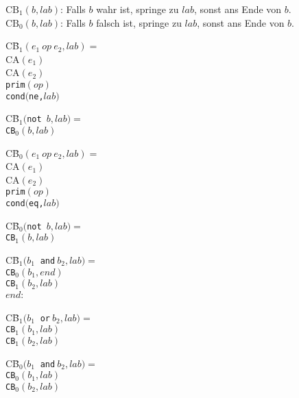 \documentclass[german,10pt, a4paper, twocolumn]{scrartcl}
\theoremstyle{definition}
\theoremstyle{remark}
\begin{document}
$\mbox{CB}_1(b,lab)$: Falls $b$ wahr ist, springe zu $lab$, sonst ans Ende von $b$.\\
$\mbox{CB}_0(b,lab)$: Falls $b$ falsch ist, springe zu $lab$, sonst ans Ende von $b$.

\begin{tabbing}
 CB\=$_1(e_1\ op\ e_2,lab) =$ \\
 \>	CA$(e_1)$\\
 \>	CA$(e_2)$\\
 \>	\tt{prim}$(op)$\\
 \>	\tt{cond}$($\tt{ne},$lab)$
\end{tabbing}

\begin{tabbing}
 CB\=$_1($\tt{not }$b,lab) =$ \\
 \>	CB$_0(b,lab)$\\
\end{tabbing}

\begin{tabbing}
 CB\=$_0(e_1\ op\ e_2,lab) =$ \\
 \>	CA$(e_1)$\\
 \>	CA$(e_2)$\\
 \>	\tt{prim}$(op)$\\
 \>	\tt{cond}$($\tt{eq},$lab)$
\end{tabbing}

\begin{tabbing}
 CB\=$_0($\tt{not }$b,lab) =$ \\
 \>	CB$_1(b,lab)$\\
\end{tabbing}

\begin{tabbing}
 CB\=$_1(b_1\ $ \tt{and}$ \ b_2,lab) =$ \\
 \>	CB$_0(b_1,end)$\\
 \>	CB$_1(b_2,lab)$\\
 $end:$
\end{tabbing}

\begin{tabbing}
 CB\=$_1(b_1\ $ \tt{or}$ \ b_2,lab) =$ \\
 \>	CB$_1(b_1,lab)$\\
 \>	CB$_1(b_2,lab)$
\end{tabbing}

\begin{tabbing}
 CB\=$_0(b_1\ $ \tt{and}$ \ b_2,lab) =$ \\
 \>	CB$_0(b_1,lab)$\\
 \>	CB$_0(b_2,lab)$
\end{tabbing}
\end{document}
